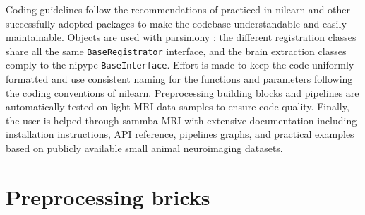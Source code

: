 \documentclass[utf8, a4paper, final, crop]{frontiersSCNS} %
\newcommand{\pythoninline}[1]{\texttt{#1}}
\begin{document}
Coding guidelines follow the recommendations of \citet{varoquaux2010software}
practiced in nilearn and other successfully adopted packages
\citep{buitinck2013api, joblib}
to make the codebase understandable and easily maintainable.
%
%
%
Objects are used with parsimony : the different registration classes share
all the same \pythoninline{BaseRegistrator} interface, and the brain extraction
classes comply to the nipype \pythoninline{BaseInterface}.
Effort is made to keep the code uniformly formatted and use consistent 
naming for the functions and parameters 
following the coding conventions of nilearn.
Preprocessing building blocks and pipelines are automatically tested on light MRI 
data samples to ensure code quality.
%
Finally, the user is helped through sammba-MRI with 
extensive documentation including installation instructions, API reference,
pipelines graphs, and practical examples based on publicly available small animal 
neuroimaging datasets.
%
%
%

\section{Preprocessing bricks}
\end{document}
